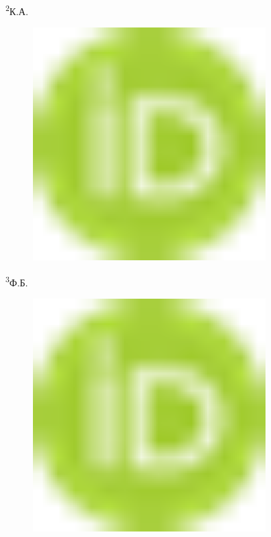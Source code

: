 {{\textsuperscript{2}К.А.
\begin{figure}[H]
	\centering
	\includegraphics[width=0.8\textwidth]{media/pish3/image1}
	\caption*{}
\end{figure}

\textsuperscript{3}Ф.Б.
\begin{figure}[H]
	\centering
	\includegraphics[width=0.8\textwidth]{media/pish3/image1}
	\caption*{}
\end{figure}


}}
